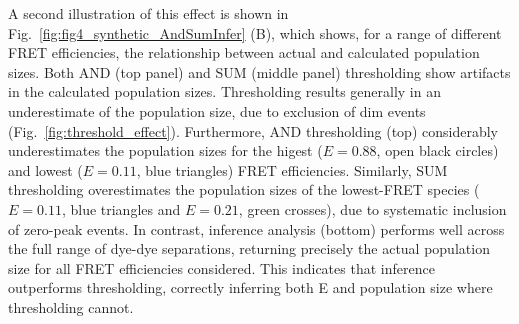 A second illustration of this effect is shown in Fig.~\ref{fig:fig4_synthetic_AndSumInfer} (B), which shows, for a range of different FRET efficiencies, the relationship between actual and calculated population sizes. Both AND (top panel) and SUM (middle panel) thresholding show artifacts in the calculated population sizes. Thresholding results generally in an underestimate of the population size, due to exclusion of dim events (Fig.~\ref{fig:threshold_effect}). Furthermore, AND thresholding (top) considerably underestimates the population sizes for the higest ($E=0.88$, open black circles) and lowest ($E = 0.11$, blue triangles) FRET efficiencies. Similarly, SUM thresholding overestimates the population sizes of the lowest-FRET species ($E = 0.11$, blue triangles and $E = 0.21$, green crosses), due to systematic inclusion of zero-peak events.   In contrast, inference analysis (bottom) performs well across the full range of dye-dye separations, returning precisely the actual population size for all FRET efficiencies considered. This indicates that inference outperforms thresholding, correctly inferring both E and population size where thresholding cannot. 

